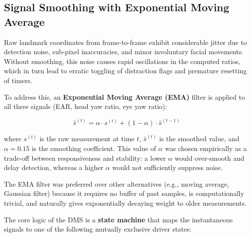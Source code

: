 \documentclass[12pt,a4paper]{article}
\begin{document}
\subsection{Signal Smoothing with Exponential Moving Average}\label{subsec:ema}

Raw landmark coordinates from frame-to-frame exhibit considerable jitter due to detection noise, sub-pixel inaccuracies, and minor involuntary facial movements. Without smoothing, this noise causes rapid oscillations in the computed ratios, which in turn lead to erratic toggling of distraction flags and premature resetting of timers.

To address this, an \textbf{Exponential Moving Average (EMA)} filter is applied to all three signals (EAR, head yaw ratio, eye yaw ratio):

\begin{equation}\label{eq:ema}
    \hat{s}^{(t)} = \alpha \cdot s^{(t)} + (1 - \alpha) \cdot \hat{s}^{(t-1)}
\end{equation}

\noindent where $s^{(t)}$ is the raw measurement at time $t$, $\hat{s}^{(t)}$ is the smoothed value, and $\alpha = 0.15$ is the smoothing coefficient. This value of $\alpha$ was chosen empirically as a trade-off between responsiveness and stability: a lower $\alpha$ would over-smooth and delay detection, whereas a higher $\alpha$ would not sufficiently suppress noise.

The EMA filter was preferred over other alternatives (e.g., moving average, Gaussian filter) because it requires no buffer of past samples, is computationally trivial, and naturally gives exponentially decaying weight to older measurements.



The core logic of the DMS is a \textbf{state machine} that maps the instantaneous signals to one of the following mutually exclusive driver states:
\end{document}
